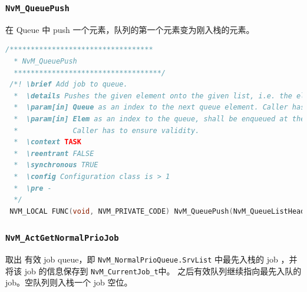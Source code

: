\subsubsection{\lstinline{NvM_QueuePush}}
在 Queue 中 push 一个元素，队列的第一个元素变为刚入栈的元素。

\begin{lstlisting}[language=C,style=C]
  /**********************************
  * NvM_QueuePush
  ***********************************/
 /*! \brief Add job to queue.
  *  \details Pushes the given element onto the given list, i.e. the element is inserted at list head.
  *  \param[in] Queue as an index to the next queue element. Caller has to ensure validity.
  *  \param[in] Elem as an index to the queue, shall be enqueued at the end of the linked list.
  *             Caller has to ensure validity.
  *  \context TASK
  *  \reentrant FALSE
  *  \synchronous TRUE
  *  \config Configuration class is > 1
  *  \pre -
  */
 NVM_LOCAL FUNC(void, NVM_PRIVATE_CODE) NvM_QueuePush(NvM_QueueListHeadRefType Queue, NvM_QueueEntryRefType Elem);
\end{lstlisting}

\subsubsection{\lstinline{NvM_ActGetNormalPrioJob}}
取出 有效 job queue，即 \lstinline{NvM_NormalPrioQueue.SrvList} 中最先入栈的 job ，并将该 job 的信息保存到 \lstinline{NvM_CurrentJob_t}中。
之后有效队列继续指向最先入队的 job。空队列则入栈一个 job 空位。

